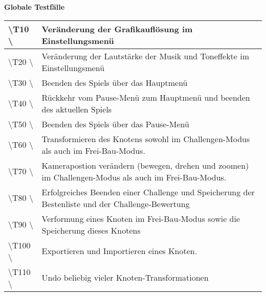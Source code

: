 \documentclass[10pt]{article}
\begin{document}
\newpage
\textbf{Globale Testfälle} \\
\begin{tabular}{|p{}|p{}|}
\hline 
\textbackslash T10  \textbackslash & Veränderung der Grafikauflösung  im Einstellungsmenü \\ 
\hline 
\textbackslash T20  \textbackslash & Veränderung der Lautstärke der Musik und Toneffekte im Einstellungsmenü  \\ 
\hline 
\textbackslash T30  \textbackslash & Beenden des Spiels über das Hauptmenü\\ 
\hline
\textbackslash T40  \textbackslash & Rückkehr vom Pause-Menü zum Hauptmenü und beenden des aktuellen Spiels \\ 
\hline
\textbackslash T50  \textbackslash & Beenden des Spiels über das Pause-Menü\\ 
\hline
\textbackslash T60  \textbackslash & Transformieren des Knotens sowohl im Challengen-Modus als auch im Frei-Bau-Modus.\\ 
\hline
\textbackslash T70  \textbackslash & Kamerapostion verändern (bewegen, drehen und zoomen) im Challengen-Modus als auch im Frei-Bau-Modus.\\ 
\hline
\textbackslash T80  \textbackslash & Erfolgreiches Beenden einer Challenge und Speicherung der Bestenliste und der Challenge-Bewertung\\ 
\hline
\textbackslash T90  \textbackslash & Verformung eines Knoten im Frei-Bau-Modus sowie die Speicherung dieses Knotens\\ 
\hline
\textbackslash T100  \textbackslash & Exportieren und Importieren eines Knoten.\\ 
\hline
\textbackslash T110  \textbackslash & Undo beliebig vieler Knoten-Transformationen\\ 
\hline
\end{tabular} 

\end{document}
